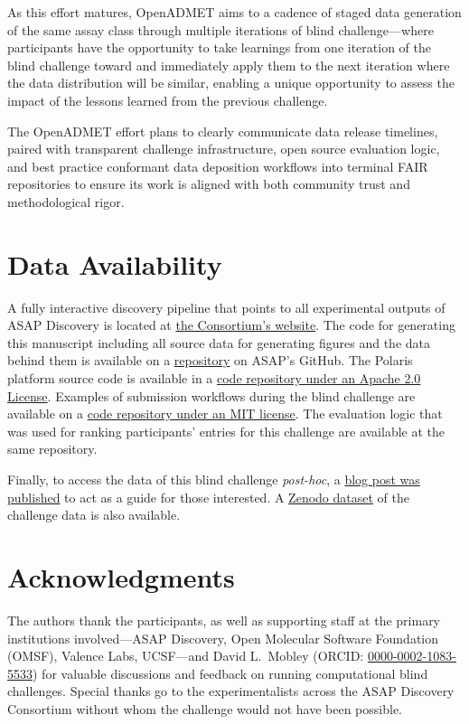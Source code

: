 \documentclass[journal=jcim,manuscript=article]{achemso}
\begin{document}
As this effort matures, OpenADMET aims to a cadence of staged data generation of the same assay class through multiple iterations of blind challenge---where participants have the opportunity to take learnings from one iteration of the blind challenge toward and immediately apply them to the next iteration where the data distribution will be similar, enabling a unique opportunity to assess the impact of the lessons learned from the previous challenge. 

The OpenADMET effort plans to clearly communicate data release timelines, paired with transparent challenge infrastructure, open source evaluation logic, and best practice conformant data deposition workflows into terminal FAIR repositories to ensure its work is aligned with both community trust and methodological rigor.

\section{Data Availability}
A fully interactive discovery pipeline that points to all experimental outputs of ASAP Discovery is located at \href{https://asapdiscovery.org/pipeline/}{the Consortium's website}. The code for generating this manuscript including all source data for generating figures and the data behind them is available on a \href{https://github.com/asapdiscovery/asap-blind-challenge-paper}{repository} on ASAP's GitHub. The Polaris platform source code is available in a \href{https://github.com/polaris-hub/polaris}{code repository under an Apache 2.0 License}. Examples of submission workflows during the blind challenge are available on a \href{https://github.com/asapdiscovery/asap-polaris-blind-challenge-examples}{code repository under an MIT license}. The evaluation logic that was used for ranking participants' entries for this challenge are available at the same repository. 

Finally, to access the data of this blind challenge \textit{post-hoc}, a \href{https://blog.omsf.io/how-to-access-the-asap-discovery-x-polarishub-x-openadmet-challenge-data/}{blog post was published} to act as a guide for those interested. A \href{https://zenodo.org/records/15582067}{Zenodo dataset} of the  challenge data is also available.

\section{Acknowledgments}

The authors thank the participants, as well as supporting staff at the primary institutions involved---ASAP Discovery, Open Molecular Software Foundation (OMSF), Valence Labs, UCSF---and David L.\ Mobley (ORCID: \href{https://orcid.org/0000-0002-1083-5533}{0000-0002-1083-5533}) for valuable discussions and feedback on running computational blind challenges. Special thanks go to the experimentalists across the ASAP Discovery Consortium without whom the challenge would not have been possible. 
\end{document}
